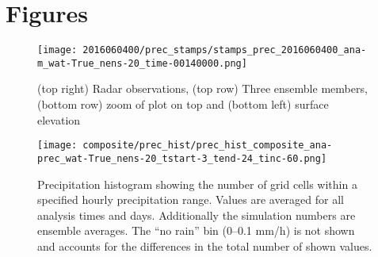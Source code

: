 \documentclass[a4paper, 12pt]{article}
\begin{document}
% 



\newpage

{\small
 }

\newpage
\section{Figures}

\begin{figure}[h!]
\noindent \centering
\texttt{[image: 2016060400/prec\_stamps/stamps\_prec\_2016060400\_ana-m\_wat-True\_nens-20\_time-00140000.png]}\\
\caption{(top right) Radar observations, (top row) Three ensemble members, (bottom row) zoom of plot on top and (bottom left) surface elevation} \label{fig:prec_stamps}
\end{figure}

\begin{figure}[h!]
\noindent \centering
\texttt{[image: composite/prec\_hist/prec\_hist\_composite\_ana-prec\_wat-True\_nens-20\_tstart-3\_tend-24\_tinc-60.png]}\\
\caption{Precipitation histogram showing the number of grid cells within a specified hourly precipitation range. Values are averaged for all analysis times and days. Additionally the simulation numbers are ensemble averages. The ``no rain'' bin (0--0.1 mm/h) is not shown and accounts for the differences in the total number of shown values.} \label{fig:prec_hist}
\end{figure}
\end{document}
